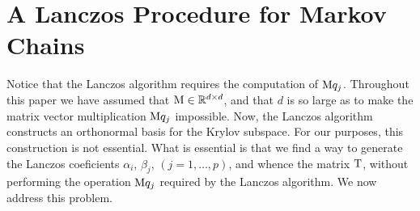 \section{A Lanczos Procedure for Markov Chains}
Notice that the Lanczos algorithm requires the computation of $\mathrm{M} q_j$. Throughout this
paper we have assumed that $\mathrm{M} \in \mathbb{R}^{d\times d}$, and that $d$ is so large as
to make the matrix vector multiplication $\mathrm{M} q_j$ impossible. Now, the Lanczos
algorithm constructs an orthonormal basis for the Krylov subspace. For our
purposes, this construction is not essential. What is essential is that we find
a way to generate the Lanczos coeficients $\alpha_i$, $\beta_j$, $(j = 1,\dots, p)$, and
whence the matrix $\mathrm{T}$, without performing the operation $\mathrm{M} q_j$ required by the
Lanczos algorithm. We now address this problem.

